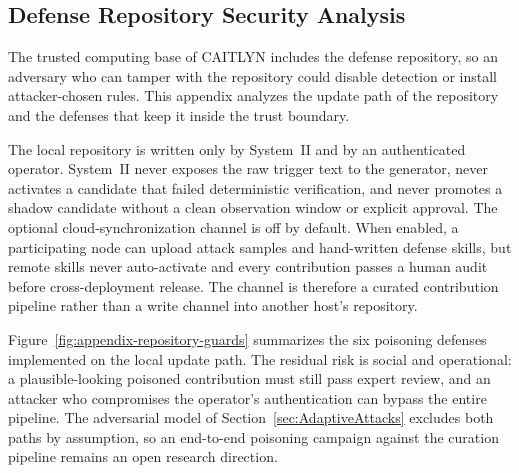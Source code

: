 \subsection{Defense Repository Security Analysis}
\label{app:repository-risks}


The trusted computing base of CAITLYN includes the defense
repository, so an adversary who can tamper with the repository could
disable detection or install attacker-chosen rules.
This appendix analyzes the update path of the repository and the defenses
that keep it inside the trust boundary.

The local repository is written only by System~II and by an authenticated
operator.
System~II never exposes the raw trigger text to the generator, never
activates a candidate that failed deterministic verification, and never
promotes a shadow candidate without a clean observation window or explicit
approval.
The optional cloud-synchronization channel is off by default.
When enabled, a participating node can upload attack samples and
hand-written defense skills, but remote skills never auto-activate and
every contribution passes a human audit before cross-deployment release.
The channel is therefore a curated contribution pipeline rather than a
write channel into another host's repository.

Figure~\ref{fig:appendix-repository-guards} summarizes the six poisoning
defenses implemented on the local update path.
The residual risk is social and operational: a plausible-looking poisoned
contribution must still pass expert review, and an attacker who compromises
the operator's authentication can bypass the entire pipeline.
The adversarial model of Section~\ref{sec:AdaptiveAttacks} excludes both
paths by assumption, so an end-to-end poisoning campaign against the
curation pipeline remains an open research direction.
